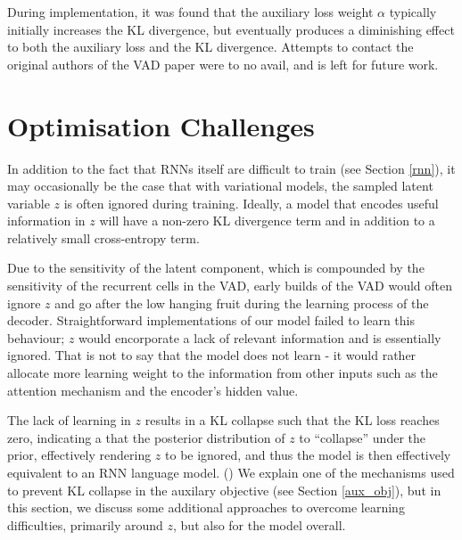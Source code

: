 \documentclass[12pt,twoside]{report}
\begin{document}
During implementation, it was found that the auxiliary loss weight $\alpha$ typically initially increases the KL divergence, but eventually produces a diminishing effect to both the auxiliary loss and the KL divergence. Attempts to contact the original authors of the VAD paper were to no avail, and is left for future work. 


\section{Optimisation Challenges}
\label{optimisation_challenges}

In addition to the fact that RNNs itself are difficult to train (see Section \ref{rnn}), it may occasionally be the case that with variational models, the sampled latent variable $z$ is often ignored during training. Ideally, a model that encodes useful information in $z$ will have a non-zero KL divergence term and in addition to a relatively small cross-entropy term. 

Due to the sensitivity of the latent component, which is compounded by the sensitivity of the recurrent cells in the VAD, early builds of the VAD would often ignore $z$ and go after the low hanging fruit during the learning process of the decoder. Straightforward implementations of our model failed to learn this behaviour; $z$ would encorporate a lack of relevant information and is essentially ignored. That is not to say that the model does not learn - it would rather allocate more learning weight to the information from other inputs such as the attention mechanism and the encoder's hidden value.

The lack of learning in $z$ results in a KL collapse such that the KL loss reaches zero, indicating a that the posterior distribution of $z$ to ``collapse'' under the prior, effectively rendering $z$ to be ignored, and thus the model is then effectively equivalent to an RNN language model. (\cite{bowman_generating_2015}) We explain one of the mechanisms used to prevent KL collapse in the auxilary objective (see Section \ref{aux_obj}), but in this section, we discuss some additional approaches to overcome learning difficulties, primarily around $z$, but also for the model overall.
\end{document}
